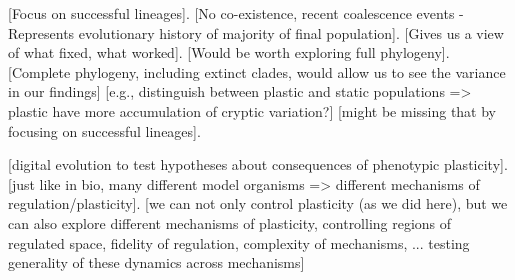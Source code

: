 [Focus on successful lineages].
[No co-existence, recent coalescence events - Represents evolutionary history of majority of final population].
[Gives us a view of what fixed, what worked].
[Would be worth exploring full phylogeny].
[Complete phylogeny, including extinct clades, would allow us to see the variance in our findings]
[e.g., distinguish between plastic and static populations => plastic have more accumulation of cryptic variation?]
[might be missing that by focusing on successful lineages].

[digital evolution to test hypotheses about consequences of phenotypic plasticity].
[just like in bio, many different model organisms => different mechanisms of regulation/plasticity].
[we can not only control plasticity (as we did here), but we can also explore different mechanisms of plasticity, controlling regions of regulated space, fidelity of regulation, complexity of mechanisms, ... testing generality of these dynamics across mechanisms]



